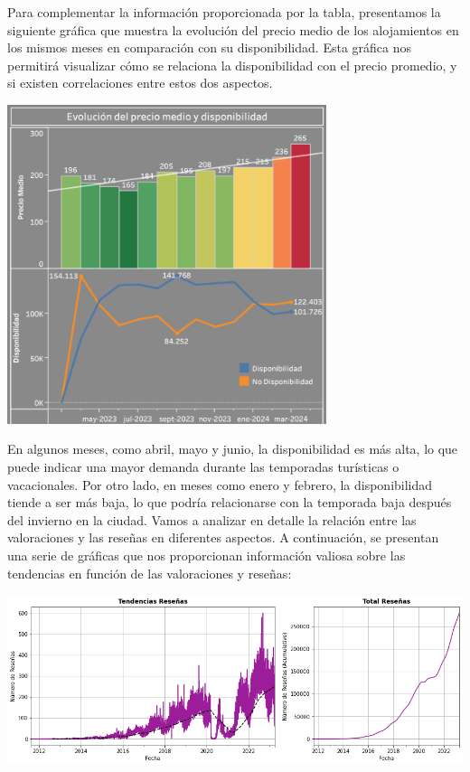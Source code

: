 Para complementar la información proporcionada por la tabla, presentamos la siguiente gráfica que muestra la evolución del precio medio de los alojamientos en los mismos meses en comparación con su disponibilidad. Esta gráfica nos permitirá visualizar cómo se relaciona la disponibilidad con el precio promedio, y si existen correlaciones entre estos dos aspectos.
\begin{center}
    \centering
    \includegraphics[width=0.7\textwidth]{capturas/18.png}
\end{center}
 En algunos meses, como abril, mayo y junio, la disponibilidad es más alta, lo que puede indicar una mayor demanda durante las temporadas turísticas o vacacionales. Por otro lado, en meses como enero y febrero, la disponibilidad tiende a ser más baja, lo que podría relacionarse con la temporada baja después del invierno en la ciudad.
 \newpage
Vamos a analizar en detalle la relación entre las valoraciones y las reseñas en diferentes aspectos. A continuación, se presentan una serie de gráficas que nos proporcionan información valiosa sobre las tendencias en función de las valoraciones y reseñas:
\begin{center}
    \centering
    \includegraphics[width=1\textwidth]{capturas/20.png}
\end{center}
